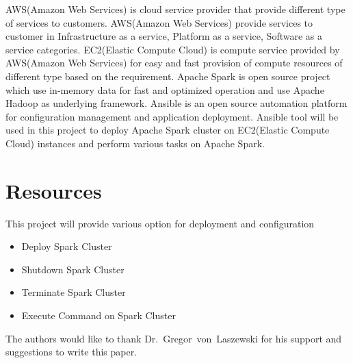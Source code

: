 AWS(Amazon Web Services)\cite{hid-sp18-511-www-aws} is cloud service
provider that provide different type of services to
customers. AWS(Amazon Web Services)\cite{hid-sp18-511-www-aws} provide
services to customer in Infrastructure as a service, Platform as a
service, Software as a service categories. EC2(Elastic Compute
Cloud)\cite{hid-sp18-511-www-ec2} is compute service provided by
AWS(Amazon Web Services)\cite{hid-sp18-511-www-aws} for easy and fast
provision of compute resources of different type based on the
requirement. Apache Spark\cite{hid-sp18-511-www-spark} is open source
project which use in-memory data for fast and optimized operation and
use Apache Hadoop\cite{hid-sp18-511-www-hadoop} as underlying
framework. Ansible\cite{hid-sp18-511-www-ansible} is an open source automation platform
for configuration management and application
deployment. Ansible\cite{hid-sp18-511-www-ansible} tool will be used
in this project to deploy Apache Spark\cite{hid-sp18-511-www-spark}
cluster on EC2(Elastic Compute Cloud)\cite{hid-sp18-511-www-ec2}
instances and perform various tasks on Apache
Spark\cite{hid-sp18-511-www-spark}.

\section{Resources}
This project will provide various option for deployment and
configuration

\begin{itemize}
	\item Deploy Spark Cluster
        \item Shutdown Spark Cluster
        \item Terminate Spark Cluster
        \item Execute Command on Spark Cluster
\end{itemize}

\begin{acks}

  The authors would like to thank Dr.~Gregor~von~Laszewski for his
  support and suggestions to write this paper.

\end{acks}


 

